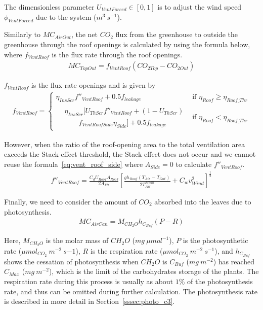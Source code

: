 \documentclass[a4paper]{article}
\numberwithin{equation}{section}
\begin{document}
The dimensionless parameter \( U_{VentForced} \in [0,1] \) is to adjust the wind speed \( \phi_{VentForced} \) due to
the system (\( m^3\ s^{-1} \)).

Similarly to \( MC_{AirOut} \), the net \( CO_2 \) flux from the greenhouse to outside the greenhouse through the roof openings is calculated by using the formula below, where \( f_{VentRoof} \) is the flux rate through the roof openings.
\begin{align}
  MC_{TopOut} = f_{VentRoof}(CO_{2 Top} - CO_{2 Out})
\end{align}

\( f_{VentRoof} \) is the flux rate openings and is given by
\begin{gather}
  f_{VentRoof} =
  \begin{cases}
    \eta_{InsScr} f''_{VentRoof} + 0.5f_{leakage} & \text{if~} \eta_{Roof} \geq \eta_{Roof\_Thr} \\
    \begin{split}
      & \eta_{InsScr} [U_{ThScr}f''_{VentRoof} + (1-U_{ThScr}) \\
      & \qquad f_{VentRoofSide} \eta_{Side}] + 0.5 f_{leakage}
    \end{split}                    & \text{if~}  \eta_{Roof} < \eta_{Roof\_Thr}
  \end{cases}
\end{gather}

However, when the ratio of the roof-opening area to the total ventilation area exceeds the Stack-effect threshold, the Stack effect does not occur and we cannot reuse the formula~\eqref{eq:vent_roof_side} where \( A_{Side} = 0 \) to
calculate \( f''_{VentRoof} \).
\begin{align}
  f''_{VentRoof} = \frac{C_d U_{Roof} A_{Roof}}{2A_{Flr}} {\left[\frac{gh_{Roof}(T_{Air} - T_{Out})}{2T^{Mean}_{Air}} + C_w v^2_{Wind}\right]}^{ \frac{1}{2}}
\end{align}

Finally, we need to consider the amount of \( CO_2 \) absorbed into the leaves due to photosynthesis.
\begin{align}
  MC_{AirCan} = M_{CH_2O} h_{C_{Buf}} (P - R)
\end{align}

Here, \( M_{CH_2O} \) is the molar mass of \( CH_2O \) (\( mg\ \mu mol^{-1} \)), \( P \) is the photosynthetic rate (\( \mu mol_{CO_2}\ m^{-2}\ s{-1} \)), \( R \) is the respiration rate (\( \mu mol_{CO_2}\ m^{-2}\ s^{-1} \)), and \( h_{C_{Buf}} \) shows the cessation of photosynthesis when \( CH_2O \) is \( C_{Buf} \) (\( mg\ m^{-2} \)) has reached \( C_{Max} \) (\( mg\ m^{-2} \)), which is the limit of the carbohydrates storage of the plants. The respiration rate during this process is usually as about \( 1\% \) of the photosynthesis rate, and thus can be omitted during further calculation. The photosynthesis rate is described in more detail in Section~\ref{sssec:photo_c3}.
\end{document}
